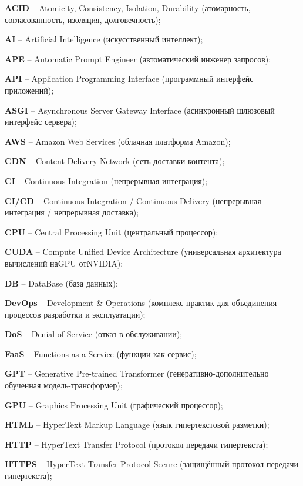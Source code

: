   \label{sec:reduction}

\par \textbf{ACID} – Atomicity, Consistency, Isolation, Durability (атомарность, согласованность, изоляция, долговечность);
\par \textbf{AI} – Artificial Intelligence (искусственный интеллект);
\par \textbf{APE} – Automatic Prompt Engineer (автоматический инженер запросов);
\par \textbf{API} – Application Programming Interface (программный интерфейс приложений);
\par \textbf{ASGI} – Asynchronous Server Gateway Interface (асинхронный шлюзовый интерфейс сервера);
\par \textbf{AWS} – Amazon Web Services (облачная платформа Amazon);
\par \textbf{CDN} – Content Delivery Network (сеть доставки контента);
\par \textbf{CI} – Continuous Integration (непрерывная интеграция);
 \par \textbf{CI/CD} – Continuous Integration / Continuous Delivery (непрерывная интеграция / непрерывная доставка);
\par \textbf{CPU} – Central Processing Unit (центральный процессор);
\par \textbf{CUDA} – Compute Unified Device Architecture (универсальная архитектура вычислений наGPU отNVIDIA);
\par \textbf{DB} – DataBase (база данных);
\par \textbf{DevOps} – Development \& Operations (комплекс практик для объединения процессов разработки и эксплуатации);
\par \textbf{DoS} – Denial of Service (отказ в обслуживании);
\par \textbf{FaaS} – Functions as a Service (функции как сервис);
\par \textbf{GPT} – Generative Pre-trained Transformer (генеративно-дополнительно обученная модель-трансформер);
\par \textbf{GPU} – Graphics Processing Unit (графический процессор);
\par \textbf{HTML} – HyperText Markup Language (язык гипертекстовой разметки);
\par \textbf{HTTP} – HyperText Transfer Protocol (протокол передачи гипертекста);
\par \textbf{HTTPS} – HyperText Transfer Protocol Secure (защищённый протокол передачи гипертекста);

